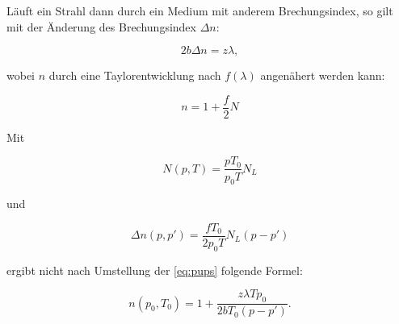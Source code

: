 Läuft ein Strahl dann durch ein Medium mit anderem Brechungsindex, so gilt mit der Änderung des Brechungsindex \(\Delta n\):

\begin{equation}
    2b\Delta n = z\lambda,
\end{equation}

wobei \(n\) durch eine Taylorentwicklung nach \(f(\lambda)\) angenähert werden kann:

\begin{equation}
    n = 1+\frac{f}{2} N
    \label{eq:pups}
\end{equation}

Mit 

\begin{equation}
    N(p,T) = \frac{pT_0}{p_0T} N_L
\end{equation}

und 

\begin{equation}
    \Delta n(p,p') = \frac{fT_0}{2p_0T} N_L (p-p')
\end{equation}

ergibt nicht nach Umstellung der \autoref{eq:pups} folgende Formel:

\begin{equation}
    n(p_0,T_0) = 1 + \frac{z\lambda T p_0}{2bT_0 (p-p')}.
    \label{eq:Druck}
\end{equation}